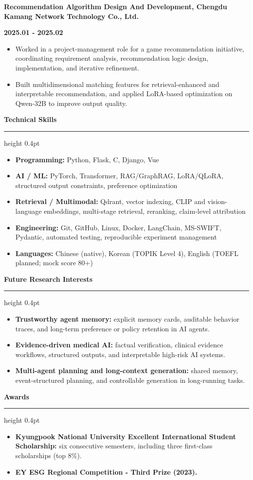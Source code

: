 \documentclass[10pt,a4paper]{article}
\newcommand{\cvsection}[1]{%
  \vspace{10pt}%
  {\Large\bfseries #1}\par%
  \vspace{1pt}%
  \hrule height 0.4pt%
  \vspace{3pt}%
}
\newcommand{\cvsectiontop}[1]{%
  {\Large\bfseries #1}\par%
  \vspace{1pt}%
  \hrule height 0.4pt%
  \vspace{3pt}%
}
\newcommand{\entrytitle}[1]{\textbf{#1}\par}
\newcommand{\entrydate}[1]{\textbf{#1}\par}
\begin{document}
\vspace{4pt}
\entrytitle{Recommendation Algorithm Design And Development, Chengdu Kamang Network Technology Co., Ltd.}
\entrydate{2025.01 - 2025.02}
\begin{itemize}
  \item Worked in a project-management role for a game recommendation initiative, coordinating requirement analysis, recommendation logic design, implementation, and iterative refinement.
  \item Built multidimensional matching features for retrieval-enhanced and interpretable recommendation, and applied LoRA-based optimization on Qwen-32B to improve output quality.
\end{itemize}

\cvsection{Technical Skills}
\begin{itemize}
  \item \textbf{Programming:} Python, Flask, C, Django, Vue
  \item \textbf{AI / ML:} PyTorch, Transformer, RAG/GraphRAG, LoRA/QLoRA, structured output constraints, preference optimization
  \item \textbf{Retrieval / Multimodal:} Qdrant, vector indexing, CLIP and vision-language embeddings, multi-stage retrieval, reranking, claim-level attribution
  \item \textbf{Engineering:} Git, GitHub, Linux, Docker, LangChain, MS-SWIFT, Pydantic, automated testing, reproducible experiment management
  \item \textbf{Languages:} Chinese (native), Korean (TOPIK Level 4), English (TOEFL planned; mock score 80+)
\end{itemize}

\newpage

\cvsectiontop{Future Research Interests}
\begin{itemize}
  \item \textbf{Trustworthy agent memory:} explicit memory cards, auditable behavior traces, and long-term preference or policy retention in AI agents.
  \item \textbf{Evidence-driven medical AI:} factual verification, clinical evidence workflows, structured outputs, and interpretable high-risk AI systems.
  \item \textbf{Multi-agent planning and long-context generation:} shared memory, event-structured planning, and controllable generation in long-running tasks.
\end{itemize}

\cvsection{Awards}
\begin{itemize}
  \item \textbf{Kyungpook National University Excellent International Student Scholarship:} six consecutive semesters, including three first-class scholarships (top 8\%).
  \item \textbf{EY ESG Regional Competition - Third Prize (2023).}
\end{itemize}
\end{document}
